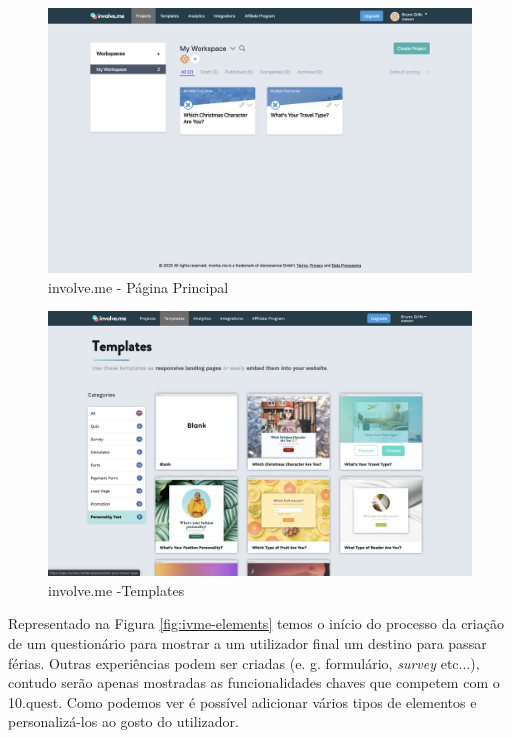 \begin{figure}[ht!]
	\begin{center}
		\includegraphics[width=1\textwidth]{img/ivme/dashboard}
		\caption{involve.me - Página Principal}
		\label{fig:ivme-dash}
	\end{center}
\end{figure}

\begin{figure}[ht!]
	\begin{center}
		\includegraphics[width=1\textwidth]{img/ivme/templates}
		\caption{involve.me -Templates}
		\label{fig:ivme-templares}
	\end{center}
\end{figure}


Representado na Figura \ref{fig:ivme-elements} temos o início do processo da criação de um questionário para mostrar a um utilizador final um destino para passar férias. Outras experiências podem ser criadas (e. g. formulário, \textit{survey} etc...), contudo serão apenas mostradas as funcionalidades chaves que competem com o 10.quest. Como podemos ver é possível adicionar vários tipos de elementos e personalizá-los ao gosto do utilizador. 


